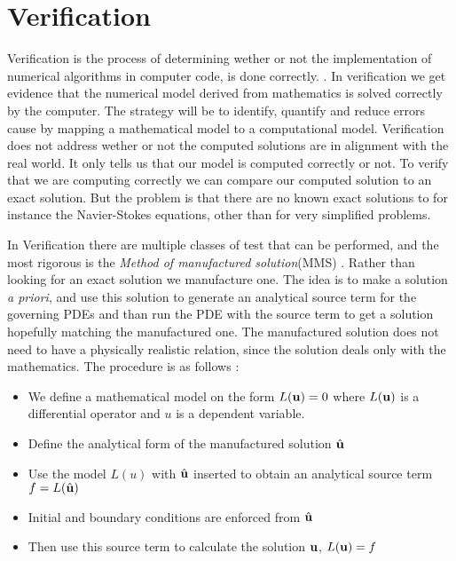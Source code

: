 \section{Verification}
Verification is the process of determining wether or not the implementation of numerical algorithms in computer code, is done correctly. \cite{Oberkampf2010}. 
In verification we get evidence that the numerical model derived from mathematics is solved correctly by the computer. The strategy will be to identify, quantify and reduce errors cause by mapping a mathematical model to a computational model. Verification does not address wether or not the computed solutions are in alignment with the real world. It only tells us that our model is computed correctly or not. To verify that we are computing correctly we can compare our computed solution to an exact solution. But the problem is that there are no known exact solutions to for instance the Navier-Stokes equations, other than for very simplified problems. \newline

In Verification there are multiple classes of test that can be performed, and the most rigorous is the \textit{Method of manufactured solution}(MMS) \cite{Oberkampf2010}. Rather than looking for an exact solution we manufacture one. The idea is to make a solution \textit{a priori},  and use this solution to generate an analytical source term for the governing PDEs and than run the PDE with the source term to get a solution hopefully matching the manufactured one. The manufactured solution does not need to have a physically realistic relation, since the solution deals only with the mathematics. 
The procedure is as follows \cite{Oberkampf2010}:
\begin{itemize}
\item We define a mathematical model on the form $ L(\bold{u}) = 0$ where $L(\bold{u})$ is a differential operator and $u$ is a dependent variable.
\item Define the analytical form of the manufactured solution $\hat{\bold{u}}$
\item Use the model $L(u)$ with $\hat{\bold{u}}$ inserted to obtain an analytical source term $ f = L(\hat{\bold{u}}) $
\item Initial and boundary conditions are enforced from $\hat{\bold{u}}$
\item Then use this source term to calculate the solution $\bold{u}$, $L(\bold{u}) = f $
\end{itemize}

